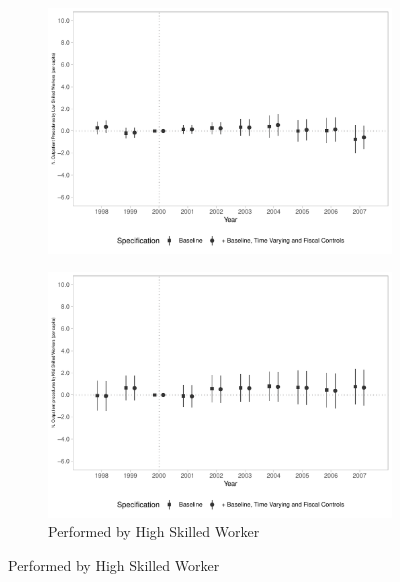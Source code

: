 \begin{figure}[h!]
\begin{center}
\begin{subfigure}{0.32\textwidth}
        \includegraphics[width=\textwidth]{plots/sia_nprod_low_skill_mun_pcapita_dist_ec29_baseline_dist_ec29_baseline_15.pdf}
    \end{subfigure}
    \begin{subfigure}{0.32\textwidth}
        \centering
        \caption{\scriptsize Performed by High Skilled Worker}\label{fig:15f}
        \includegraphics[width=\textwidth]{plots/sia_nprod_med_skill_mun_pcapita_dist_ec29_baseline_dist_ec29_baseline_15.pdf}
    \end{subfigure}
    
    \end{center}
    
\end{figure}